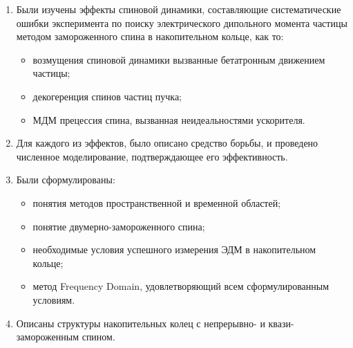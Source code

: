 \begin{enumerate}
  \item Были изучены эффекты спиновой динамики, составляющие систематические ошибки эксперимента по поиску
  электрического дипольного момента частицы методом замороженного спина в накопительном кольце, как то:
  \begin{itemize}
  	\item возмущения спиновой динамики вызванные бетатронным движением частицы;
  	\item декогеренция спинов частиц пучка;
  	\item МДМ прецессия спина, вызванная неидеальностями ускорителя.
  \end{itemize}
  \item Для каждого из эффектов, было описано средство борьбы, и проведено численное моделирование,
  подтверждающее его эффективность.
  \item Были сформулированы:
  \begin{itemize}
  	\item понятия методов пространственной и временной областей;
  	\item понятие двумерно-замороженного спина;
  	\item необходимые условия успешного измерения ЭДМ в накопительном кольце;
  	\item метод Frequency Domain, удовлетворяющий всем сформулированным условиям.
  \end{itemize}
  \item Описаны структуры накопительных колец с непрерывно- и квази-замороженным спином.
\end{enumerate}
